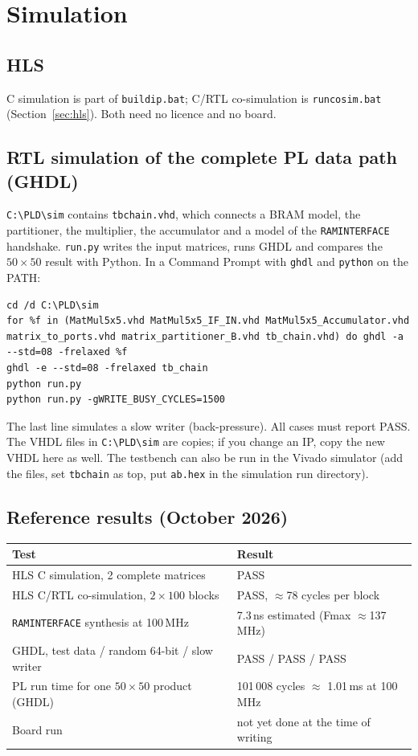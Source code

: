 \documentclass[11pt,a4paper]{article}
\newcommand{\code}[1]{\texttt{#1}}
\newcommand{\bs}{\textbackslash\allowbreak{}}
\renewcommand{\_}{\oldunderscore\allowbreak{}}
\newcommand{\pld}[1]{\code{C:\bs PLD\bs #1}}
\begin{document}
\section{Simulation}\label{sec:sim}
\subsection{HLS}
C simulation is part of \code{build\_ip.bat}; C/RTL co-simulation is \code{run\_cosim.bat} (Section~\ref{sec:hls}). Both need no licence and no board.

\subsection{RTL simulation of the complete PL data path (GHDL)}
\pld{sim} contains \code{tb\_chain.vhd}, which connects a BRAM model, the partitioner, the multiplier, the accumulator and a model of the \code{RAM\_INTERFACE} handshake. \code{run.py} writes the input matrices, runs GHDL and compares the $50\times50$ result with Python. In a Command Prompt with \code{ghdl} and \code{python} on the PATH:
\begin{lstlisting}
cd /d C:\PLD\sim
for %f in (MatMul5x5.vhd MatMul5x5_IF_IN.vhd MatMul5x5_Accumulator.vhd matrix_to_ports.vhd matrix_partitioner_B.vhd tb_chain.vhd) do ghdl -a --std=08 -frelaxed %f
ghdl -e --std=08 -frelaxed tb_chain
python run.py
python run.py -gWRITE_BUSY_CYCLES=1500
\end{lstlisting}
The last line simulates a slow writer (back-pressure). All cases must report PASS. The VHDL files in \pld{sim} are copies; if you change an IP, copy the new VHDL here as well. The testbench can also be run in the Vivado simulator (add the files, set \code{tb\_chain} as top, put \code{a\_b.hex} in the simulation run directory).

\subsection{Reference results (October 2026)}
\begin{tabularx}{\textwidth}{@{}Yl@{}}
\toprule
\textbf{Test} & \textbf{Result} \\
\midrule
HLS C simulation, 2 complete matrices & PASS \\
HLS C/RTL co-simulation, $2\times100$ blocks & PASS, $\approx$78 cycles per block \\
\code{RAM\_INTERFACE} synthesis at 100\,MHz & 7.3\,ns estimated (Fmax $\approx$137\,MHz) \\
GHDL, test data / random 64-bit / slow writer & PASS / PASS / PASS \\
PL run time for one $50\times50$ product (GHDL) & 101\,008 cycles $\approx$ 1.01\,ms at 100\,MHz \\
Board run & not yet done at the time of writing \\
\bottomrule
\end{tabularx}
\end{document}
